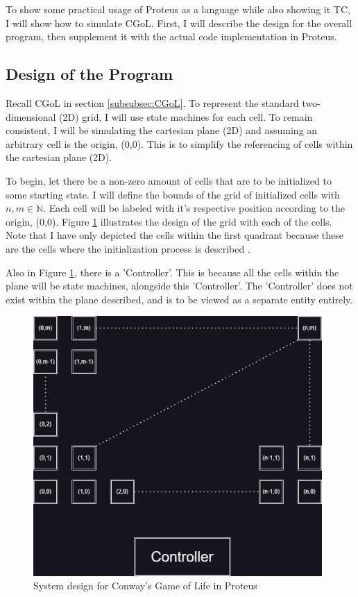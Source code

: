 To show some practical usage of Proteus as a language while also showing it TC, I will show how to simulate CGoL.
First, I will describe the design for the overall program, then supplement it with the actual code implementation in Proteus.

\subsection{Design of the Program}

Recall CGoL in section \ref{subsubsec:CGoL}.
To represent the standard two-dimensional (2D) grid, I will use state machines for each cell.
To remain consistent, I will be simulating the cartesian plane (2D) and assuming an arbitrary cell is the origin, (0,0).
This is to simplify the referencing of cells within the cartesian plane (2D).

To begin, let there be a non-zero amount of cells that are to be initialized to some starting state.
I will define the bounds of the grid of initialized cells with $n,m \in \mathbb{N}$.
Each cell will be labeled with it's respective position according to the origin, (0,0).
Figure \ref{fig:ProteusCGoLDesign} illustrates the design of the grid with each of the cells.
Note that I have only depicted the cells within the first quadrant because these are the cells where the initialization process is described \cite{CartesianPlane}.

Also in Figure \ref{fig:ProteusCGoLDesign}, there is a 'Controller'.
This is because all the cells within the plane will be state machines, alongside this 'Controller'.
The 'Controller' does not exist within the plane described, and is to be viewed as a separate entity entirely.

\begin{figure}[htb]
    \centering
    \includegraphics[width=11cm]{Images/CGoLDesign.png}
       \caption{System design for Conway's Game of Life in Proteus}
           \label{fig:ProteusCGoLDesign}
\end{figure}


